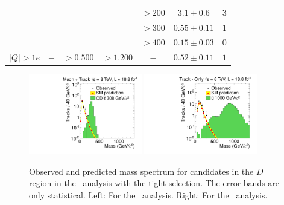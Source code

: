 \begin{table}
\begin{center}
\begin{tabular}{|l|c|c|c|c|cc|}
                        &                         &                            &                            & $> 200$   & $3.1\pm0.6$    & $3$  \\
                        &                         &                            &                            & $> 300$   & $0.55\pm0.11$  & $1$  \\
                        &                         &                            &                            & $> 400$   & $0.15\pm0.03$  & $0$ \\ \hline
$|Q|>1e$                &           $-$           &       $> 0.500$            &        $> 1.200 $          &    $-$    & $0.52\pm 0.11$ & $1$ \\ \hline

 \end{tabular}
 \end{center}
\end{table}

\begin{figure}
 \begin{center}
  \includegraphics[clip=true, trim=0.0cm 0cm 2.8cm 0cm,width=0.44\textwidth]{figures/tkmu/RescaleNoRatio_Mass_8TeV_TightNoSMMC}
  \includegraphics[clip=true, trim=0.0cm 0cm 2.8cm 0cm,width=0.44\textwidth]{figures/tkonly/RescaleNoRatio_Mass_8TeV_TightNoSMMC}
 \end{center}
 \caption[Observed and predicted mass spectrum for candidates in the signal region with the final selection thresholds in the \tktof\ and \tkonly\ analyses.]
{Observed and predicted mass spectrum for candidates in the $D$ region in the \tktof\ analysis with the tight selection.
The error bands are only statistical. Left: For the \tktof\ analysis. Right: For the \tkonly\ analysis.}
\label{fig:TightMassDistribution}
\end{figure}